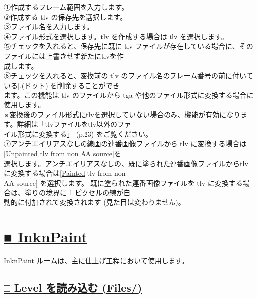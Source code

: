 \documentclass[a4paper,10pt]{article}
\begin{document}
\small
\noindent ①作成するフレーム範囲を入力します。\\
②作成する tlv の保存先を選択します。\\
③ファイル名を入力します。\\
④ファイル形式を選択します。tlv を作成する場合は tlv を選択します。\\
⑤チェックを入れると、保存先に既に tlv ファイルが存在している場合に、そのファイルには上書きせず新たにtlvを作\\
成します。\\
⑥チェックを入れると、変換前の tlv のファイル名のフレーム番号の前に付いている[.(ドット)]を削除することができ\\
ます。この機能は tlv のファイルから tga や他のファイル形式に変換する場合に使用します。\\
※変換後のファイル形式にtlvを選択していない場合のみ、機能が有効になります。詳細は「tlvファイルをtlv以外のファ\\
イル形式に変換する」 (p.23) をご覧ください。\\
⑦アンチエイリアスなしの\uline{線画の}連番画像ファイルから tlv に変換する場合は [\uline{Unpainted} tlv from non AA source]を\\
選択します。アンチエイリアスなしの、\uline{既に塗られた}連番画像ファイルからtlvに変換する場合は[\uline{Painted} tlv from non\\
AA source] を選択します。 既に塗られた連番画像ファイルを tlv に変換する場合は、塗りの境界に 1 ピクセルの線が自\\
動的に付加されて変換されます (見た目は変わりません)。

\newpage

\section*{\uline{■ InknPaint}}

\noindent InknPaint ルームは、主に仕上げ工程において使用します。\\[-0.3em]

\subsection*{\uline{□ Level を読み込む (Files/)}}
\end{document}

